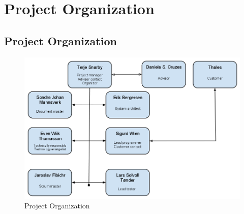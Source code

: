 \section{Project Organization}

\subsection{Project Organization}

\begin{figure}[here]
\includegraphics[scale=0.45]{./planning/img/organization.png}
\caption{Project Organization}
\label{fig:orgchart}
\end{figure}
